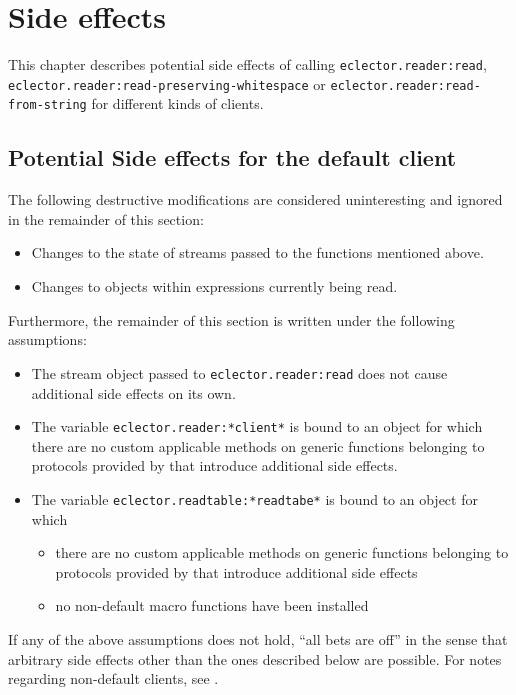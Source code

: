 \chapter{Side effects}
\label{chap:side-effects}

This chapter describes potential side effects of calling
\texttt{eclector.reader:read},
\texttt{eclector.reader:read-preserving-whitespace} or
\texttt{eclector.reader:read-from-string} for different kinds of
clients.

\section{Potential Side effects for the default client}
\label{sec:side-effects-default-client}

The following destructive modifications are considered uninteresting
and ignored in the remainder of this section:

\begin{itemize}
\item Changes to the state of streams passed to the functions
  mentioned above.
\item Changes to objects within expressions currently being read.
\end{itemize}

Furthermore, the remainder of this section is written under the
following assumptions:

\begin{itemize}
\item The stream object passed to \texttt{eclector.reader:read} does
  not cause additional side effects on its own.
\item The variable \texttt{eclector.reader:*client*} is bound to an
  object for which there are no custom applicable methods on generic
  functions belonging to protocols provided by \sysname{} that
  introduce additional side effects.
\item The variable \texttt{eclector.readtable:*readtabe*} is bound to
  an object for which
  \begin{itemize}
  \item there are no custom applicable methods on generic functions
    belonging to protocols provided by \sysname{} that introduce
    additional side effects
  \item no non-default macro functions have been installed
  \end{itemize}
\end{itemize}

If any of the above assumptions does not hold, ``all bets are off'' in
the sense that arbitrary side effects other than the ones described
below are possible.  For notes regarding non-default clients,
see .


